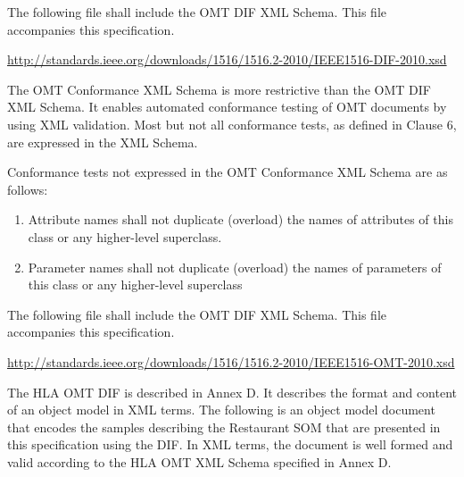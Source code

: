 The following file shall include the OMT DIF XML Schema. This file accompanies this specification.

\url{http://standards.ieee.org/downloads/1516/1516.2-2010/IEEE1516-DIF-2010.xsd}
\endgroup

\newpage
\begingroup
\annexbodyfont
\setlength{\parskip}{12pt plus 1pt minus 1pt}
The OMT Conformance XML Schema is more restrictive than the OMT DIF XML Schema. It enables automated conformance testing of OMT documents by using XML validation. Most but not all conformance tests, as defined in Clause 6, are expressed in the XML Schema.

Conformance tests not expressed in the OMT Conformance XML Schema are as follows:
\begin{enumerate}[leftmargin=52pt,labelsep=12pt,label=\arabic*),itemsep=0pt,topsep=-2pt,partopsep=0pt,parsep=0pt]
\item Attribute names shall not duplicate (overload) the names of attributes of this class or any higher-level superclass.
\item Parameter names shall not duplicate (overload) the names of parameters of this class or any higher-level superclass
\end{enumerate}

The following file shall include the OMT DIF XML Schema. This file accompanies this specification.

\url{http://standards.ieee.org/downloads/1516/1516.2-2010/IEEE1516-OMT-2010.xsd}
\endgroup

\newpage
\begingroup
\annexbodyfont
\setlength{\parskip}{12pt plus 1pt minus 1pt}
The HLA OMT DIF is described in Annex D. It describes the format and content of an object model in XML terms. The following is an object model document that encodes the samples describing the Restaurant SOM that are presented in this specification using the DIF. In XML terms, the document is well formed and valid according to the HLA OMT XML Schema specified in Annex D.

